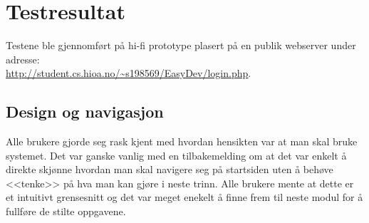\section{Testresultat}
Testene ble gjennomført på hi-fi prototype plasert på en publik webserver under adresse:\\ \href{http://student.cs.hioa.no/~s198569/EasyDev/login.php}{\underline{http://student.cs.hioa.no/\~{}s198569/EasyDev/login.php}}. 

\subsection{Design og navigasjon}
Alle brukere gjorde seg rask kjent med hvordan hensikten var at man skal bruke systemet. Det var ganske vanlig med en tilbakemelding om at det var enkelt å direkte skjønne hvordan man skal navigere seg på startsiden uten å behøve <<tenke>> på hva man kan gjøre i neste trinn. Alle brukere mente at dette er et intuitivt grensesnitt og det var meget enekelt å finne frem til neste modul for å fullføre de stilte oppgavene.